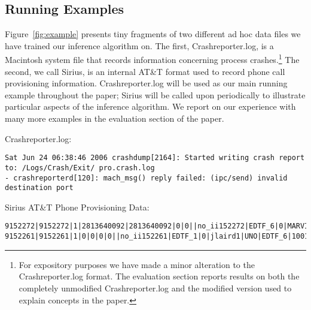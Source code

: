 \subsection{Running Examples}

Figure~\ref{fig:example} presents tiny fragments of two
different ad hoc data files we have trained our inference algorithm
on.  The first, Crashreporter.log, is a Macintosh
system file that records information concerning process crashes.\footnote{For
expository purposes we have made a minor alteration to the Crashreporter.log
format.  The evaluation section reports results on both the 
completely unmodified Crashreporter.log and the modified version
used to explain concepts in the paper.} The
second, we call Sirius, is an internal AT\&T format used to
record phone call provisioning information. 
Crashreporter.log will be used as our main running example throughout the
paper; Sirius will be called upon periodically to illustrate
particular aspects of the inference algorithm.  We report on our experience
with many more examples in the evaluation section of the paper.

\begin{figure*}
Crashreporter.log:
{\small \begin{verbatim}
Sat Jun 24 06:38:46 2006 crashdump[2164]: Started writing crash report to: /Logs/Crash/Exit/ pro.crash.log
- crashreporterd[120]: mach_msg() reply failed: (ipc/send) invalid destination port
\end{verbatim}
}

Sirius AT\&T Phone Provisioning Data:
{\small \begin{verbatim}
9152272|9152272|1|2813640092|2813640092|0|0||no_ii152272|EDTF_6|0|MARVINS1|UNO|10|1000295291
9152261|9152261|1|0|0|0|0||no_ii152261|EDTF_1|0|jlaird1|UNO|EDTF_6|1001390400|EDTF_OS_10|1001476801
\end{verbatim}
}



\caption {Example ad hoc data sources.}
\label{fig:example}
\end{figure*}

